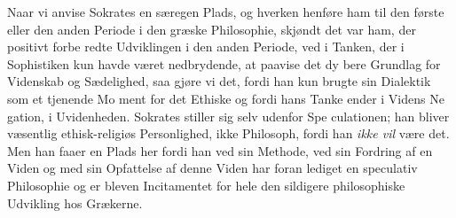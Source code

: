 \documentclass[12pt,a4paper]{book}
\begin{document}
Naar vi anvise Sokrates en særegen Plads, og hverken
henføre ham til den første eller den anden Periode i den
græske Philosophie, skjøndt det var ham, der positivt forbe\-%
redte Udviklingen i den anden Periode, ved i Tanken, der i
Sophistiken kun havde været nedbrydende, at paavise det dy\-%
bere Grundlag for Videnskab og Sædelighed, saa gjøre vi
det, fordi han kun brugte sin Dialektik som et tjenende Mo\-%
ment for det Ethiske og fordi hans Tanke ender i Videns Ne\-%
gation, i Uvidenheden. Sokrates stiller sig selv udenfor Spe\-%
culationen; han bliver væsentlig ethisk-religiøs Personlighed,
ikke Philosoph, fordi han \emph{ikke vil} være det. Men han faaer
en Plads her fordi han ved sin Methode, ved sin Fordring af
en Viden og med sin Opfattelse af denne Viden har foran\-%
lediget en speculativ Philosophie og er bleven Incitamentet
for hele den sildigere philosophiske Udvikling hos Grækerne.
\end{document}
